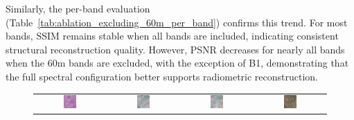 Similarly, the per-band evaluation (Table~\ref{tab:ablation_excluding_60m_per_band}) confirms this trend. For most bands, SSIM remains stable when all bands are included, indicating consistent structural reconstruction quality. However, PSNR decreases for nearly all bands when the 60m bands are excluded, with the exception of B1, demonstrating that the full spectral configuration better supports radiometric reconstruction.
\begin{figure}[h!]
    \centering
    \setlength{\tabcolsep}{2pt} %
    \renewcommand{\arraystretch}{1.0} %

    \begin{tabular}{cccc}
        \includegraphics[width=0.2\textwidth, height=0.2\textheight, keepaspectratio]{img/exclusion_60_m/bands10/sample_000034_sar_pseudo.png} &
        \includegraphics[width=0.2\textwidth, height=0.2\textheight, keepaspectratio]{img/exclusion_60_m/bands10/sample_000034_pred_rgb.png} &
        \includegraphics[width=0.2\textwidth, height=0.2\textheight, keepaspectratio]{img/exclusion_60_m/bands13/sample_000034_pred_rgb.png} &
        \includegraphics[width=0.2\textwidth, height=0.2\textheight, keepaspectratio]{img/exclusion_60_m/bands10/sample_000034_true_rgb.png} \\


\end{tabular}
\end{figure}
